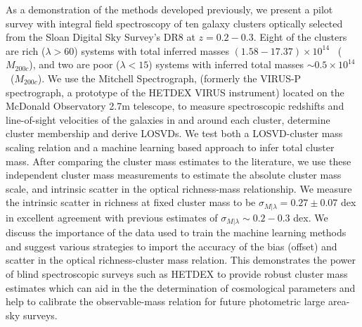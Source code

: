 As a demonstration of the methods developed previously, we present a pilot survey with integral field spectroscopy of ten galaxy clusters optically selected from the Sloan Digital Sky Survey's DR8 at $z=0.2-0.3$. Eight of the clusters are rich ($\lambda>60$) systems with total inferred masses $(1.58-17.37) \times 10^{14}$ \Msol\ ($M_{200c}$), and two are poor ($\lambda<15$) systems with inferred total masses $\sim0.5 \times 10^{14}$ \Msol\ ($M_{200c}$). We use the Mitchell Spectrograph, (formerly the VIRUS-P spectrograph, a prototype of the HETDEX VIRUS instrument) located on the McDonald Observatory 2.7m telescope, to measure spectroscopic redshifts and line-of-sight velocities of the galaxies in and around each cluster, determine cluster membership and derive LOSVDs. We test both a LOSVD-cluster mass scaling relation and a machine learning based approach to infer total cluster mass. After comparing the cluster mass estimates to the literature, we use these independent cluster mass measurements to estimate the absolute cluster mass scale, and intrinsic scatter in the optical richness-mass relationship. We measure the intrinsic scatter in richness at fixed cluster mass to be $\sigma_{M|\lambda} = 0.27\pm0.07$ dex in excellent agreement with previous estimates of $\sigma_{M|\lambda} \sim 0.2-0.3$ dex. We discuss the importance of the data used to train the machine learning methods and suggest various strategies to import the accuracy of the bias (offset) and scatter in the optical richness-cluster mass relation. This demonstrates the power of blind spectroscopic surveys such as HETDEX to provide robust cluster mass estimates which can aid in the the determination of cosmological parameters and help to calibrate the observable-mass relation for future photometric large area-sky surveys.
\pagebreak{}
